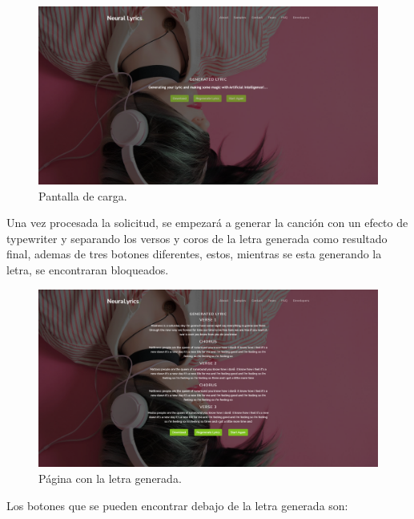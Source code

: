 \documentclass[12pt, a4paper, titlepage]{report}
\begin{document}
\begin{figure}[H] 
	\includegraphics[width=13.5cm]{./imagenes/Pruebas/pgenerating.png}
	\centering \caption{Pantalla de carga.}
\end{figure}

Una vez procesada la solicitud, se empezará a generar la canción con un efecto de typewriter y separando los versos y coros de la letra generada como resultado final, ademas de  tres botones diferentes, estos, mientras se esta generando la letra, se encontraran bloqueados.

\begin{figure}[H] 
	\includegraphics[width=13.5cm]{./imagenes/Pruebas/Generated.png}
	\centering \caption{Página con la letra generada.}
\end{figure}

Los botones que se pueden encontrar debajo de la letra generada son:
\end{document}

